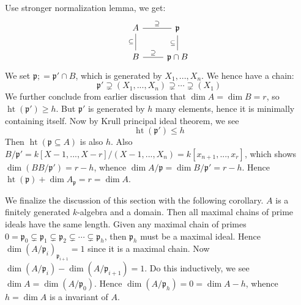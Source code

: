 \documentclass[12pt]{article}
\theoremstyle{definition}
\theoremstyle{plain}
\DeclareMathOperator{\Ht}{ht}
\begin{document}
 Use stronger normalization lemma, we get:
\begin{equation}
  \begin{tikzcd}
    A\rar[-]{\supseteq} &\mathfrak{p}\\
    B\uar[-]{\subseteq}\rar[-]{\supseteq}&\mathfrak{p}\cap B\uar[-]{\subseteq}
  \end{tikzcd}
\end{equation}
We set $\mathfrak{p};=\mathfrak{p}'\cap B$, which is generated by $X_1, ..., X_n$. We hence have a chain:
\[\mathfrak{p}'\supsetneq (X_1, ..., X_n)\supsetneq \cdots \supsetneq (X_1)\]
We further conclude from earlier discussion that $\dim A=\dim B=r$, so $\Ht(\mathfrak{p}')\geq h$. But $\mathfrak{p}'$ is generated by $h$ many elements, hence it is minimally containing itself. Now by Krull principal ideal theorem, we see
\[\Ht(\mathfrak{p}')\leq h\]
Then $\Ht(\mathfrak{p}\subseteq A)$ is also $h$. Also $B/\mathfrak{p}'=k[X-1, ..., X-r]/(X-1, ..., X_n)=k[x_{n+1}, ..., x_r]$, which shows $\dim (BB/\mathfrak{p}')=r-h$, whence $\dim A/\mathfrak{p}=\dim B/\mathfrak{p}'=r-h$. Hence $\Ht(\mathfrak{p})+\dim A_\mathfrak{p}=r=\dim A$. \qedhere

We finalize the discussion of this section with the following corollary. 
\Cor $A$ is a finitely generated $k$-algebra and a domain. Then all maximal chains of prime ideals have the same length.
\proof Given any maximal chain of primes $0=\mathfrak{p}_0\subsetneq \mathfrak{p}_1\subsetneq \mathfrak{p}_2\subsetneq \cdots \subsetneq \mathfrak{p}_h$, then $\mathfrak{p}_h$ must be a maximal ideal. Hence $\dim(A/\mathfrak{p}_i)_{\mathfrak{p}_{i+1}}=1$ since it is a maximal chain. Now $\dim(A/\mathfrak{p}_i)-\dim(A/\mathfrak{p}_{i+1})=1$. Do this inductively, we see $\dim A=\dim(A/\mathfrak{p}_0)$. Hence $\dim (A/\mathfrak{p}_h)=0=\dim A-h$, whence $h=\dim A$ is a invariant of $A$. \qedhere
\end{document}
